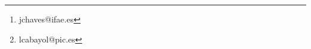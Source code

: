 \author[]{
J.~Chaves-Montero$^{1}$\thanks{jchaves@ifae.es},
L.~Cabayol-Garcia$^{1,2}$\thanks{lcabayol@pic.es}, M.~Lokken$^{1}$,
A.~Font-Ribera$^{1}$, 
and others
\\ \\
$^{1}$Institut de F\'{\i}sica d'Altes Energies (IFAE), The Barcelona Institute of Science and Technology, 08193 Bellaterra (Barcelona), Spain \\
$^{2}$ Port d'Informaci\'{o} Cient\'{i}fica, Campus UAB, C. Albareda s/n, 08193 Bellaterra (Barcelona), Spain\\}